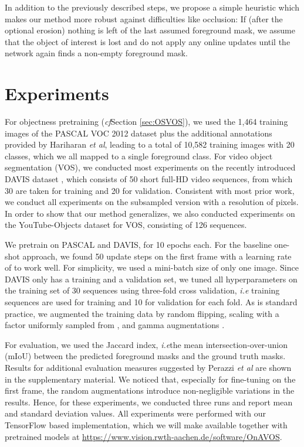 \documentclass{bmvc2k}
\def\etal{\emph{et al}\bmvaOneDot}
\def\ie{\emph{i.e}\bmvaOneDot}
\def\cf{\emph{cf}\bmvaOneDot}
\newcommand{\PAR}[1]{\vskip4pt \noindent {\bf #1~}}
\newcommand{\PARbegin}[1]{\noindent {\bf #1~}}
\begin{document}
In addition to the previously described steps, we propose a simple heuristic which makes our method more robust against difficulties like occlusion: If (after the optional erosion) nothing is left of the last assumed foreground mask, we assume that the object of interest is lost and do not apply any online updates until the network again finds a non-empty foreground mask.





\section{Experiments}
\PARbegin{Datasets.}
For objectness pretraining (\cf Section \ref{sec:OSVOS}), we used the 1,464 training images of the PASCAL VOC 2012 dataset \cite{pascalVOC} plus the additional annotations provided by Hariharan \etal \cite{PASCALaug}, leading to a total of 10,582 training images with 20 classes, which we all mapped to a single foreground class. For video object segmentation (VOS), we conducted most experiments on the recently introduced DAVIS dataset \cite{DAVIS2016}, which consists of 50 short full-HD video sequences, from which 30 are taken for training and 20 for validation. Consistent with most prior work, we conduct all experiments on the subsampled version with a resolution of  pixels. In order to show that our method generalizes, we also conducted experiments on the YouTube-Objects \cite{YoutubeObjectsOriginal, YoutubeObjectsSegmentation} dataset for VOS, consisting of 126 sequences.



\PAR{Experimental Setup.}
We pretrain on PASCAL and DAVIS, for 10 epochs each. For the baseline one-shot approach, we found 50 update steps on the first frame with a learning rate of  to work well. For simplicity, we used a mini-batch size of only one image.
Since DAVIS only has a training and a validation set, we tuned all hyperparameters on the training set of 30 sequences using three-fold cross validation, \ie 20 training sequences are used for training and 10 for validation for each fold. As is standard practice, we augmented the training data by random flipping, scaling with a factor uniformly sampled from , and gamma augmentations \cite{FRRN}. 

For evaluation, we used the Jaccard index, \ie the mean intersection-over-union (mIoU) between the predicted foreground masks and the ground truth masks. Results for additional evaluation measures suggested by Perazzi \etal \cite{DAVIS2016} are shown in the supplementary material. We noticed that, especially for fine-tuning on the first frame, the random augmentations introduce non-negligible variations in the results. Hence, for these experiments, we conducted three runs and report mean and standard deviation values. All experiments were performed with our TensorFlow \cite{tensorflow2015-whitepaper} based implementation, which we will make available together with pretrained models at \url{https://www.vision.rwth-aachen.de/software/OnAVOS}.
\end{document}
